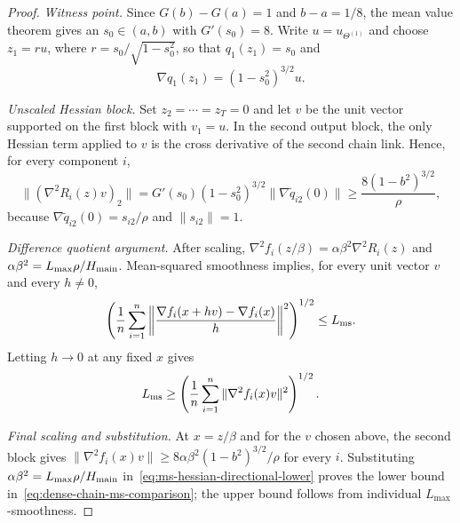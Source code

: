 \documentclass{article}
\theoremstyle{definition}
\begin{document}
\begin{proof}
\emph{Witness point.}
Since $G(b)-G(a)=1$ and $b-a=1/8$, the mean value theorem gives an
$s_0\in(a,b)$ with $G'(s_0)=8$.  Write $u=u_{\Theta^{(1)}}$ and choose
$z_1=ru$, where $r=s_0/\sqrt{1-s_0^2}$, so that $q_1(z_1)=s_0$ and
\begin{equation}
 \nabla q_1(z_1)=(1-s_0^2)^{3/2}u.
\end{equation}

\emph{Unscaled Hessian block.}
Set $z_2=\cdots=z_T=0$ and let $v$ be the unit vector supported on the
first block with $v_1=u$.  In the second output block, the only Hessian term
applied to $v$ is the cross derivative of the second chain link.  Hence, for
every component $i$,
\begin{equation}
 \bigl\|(\nabla^2R_i(z)v)_2\bigr\|
 =G'(s_0)(1-s_0^2)^{3/2}
   \|\nabla\widetilde q_{i2}(0)\|
 \ge\frac{8(1-b^2)^{3/2}}\rho,
\end{equation}
because $\nabla\widetilde q_{i2}(0)=s_{i2}/\rho$ and $\|s_{i2}\|=1$.

\emph{Difference quotient argument.}
After scaling, $\nabla^2f_i(z/\beta)=\alpha\beta^2\nabla^2R_i(z)$ and
$\alpha\beta^2=L_{\max}\rho/H_{\rm main}$.  Mean-squared smoothness implies, for every
unit vector $v$ and every $h\ne0$,
\begin{equation}
 \left(\frac1n\sum_{i=1}^n
 \left\|\frac{\nabla f_i(x+hv)-\nabla f_i(x)}{h}\right\|^2\right)^{1/2}
 \le L_{\rm ms}.
\end{equation}
Letting $h\to0$ at any fixed $x$ gives
\begin{equation}
 L_{\rm ms}\ge
 \left(\frac1n\sum_{i=1}^n\|\nabla^2f_i(x)v\|^2\right)^{1/2}.
 \label{eq:ms-hessian-directional-lower}
\end{equation}

\emph{Final scaling and substitution.}
At $x=z/\beta$ and for the $v$ chosen above, the second block gives
$\|\nabla^2f_i(x)v\|\ge
8\alpha\beta^2(1-b^2)^{3/2}/\rho$ for every $i$.  Substituting
$\alpha\beta^2=L_{\max}\rho/H_{\rm main}$
in~\eqref{eq:ms-hessian-directional-lower} proves the lower bound
in~\eqref{eq:dense-chain-ms-comparison}; the upper bound follows from
individual $L_{\max}$-smoothness.
\end{proof}
\end{document}

